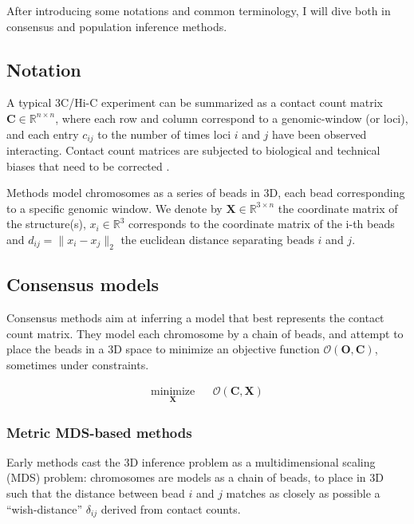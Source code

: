 \documentclass[letterpaper,12pt]{article}
\newcommand{\Xb}{\textbf{X}}
\newcommand{\RR}{\mathbb{R}}
\begin{document}
After introducing some notations and common terminology, I will dive both in
consensus and population inference methods.

\subsection*{Notation}

A typical 3C/Hi-C experiment can be summarized as a contact
count matrix $\mathbf{C} \in \RR^{n \times n}$, where each row and column
correspond to a genomic-window (or loci), and each entry $c_{ij}$ to the
number of times loci $i$ and $j$ have been observed interacting. Contact count
matrices are subjected to biological and technical biases that need to be
corrected \citep{imakaev:iterative, cournac:normalization, yaffe:probabilistic,
hu:hicnorm}.

Methods model chromosomes as a series of beads in 3D, each bead corresponding
to a specific genomic window. We denote by $\textbf{X} \in \RR^{3 \times n}$
the coordinate matrix of the structure(s), $x_i \in \RR^3$ corresponds to
the coordinate matrix of the i-th beads and $d_{ij} = \|x_i - x_j\|_2$ the
euclidean distance separating beads $i$ and $j$.

\subsection*{Consensus models}

Consensus methods aim at inferring a model that best represents the contact
count matrix. They model each chromosome by a chain of beads, and attempt to
place the beads in a 3D space to minimize an objective function
$\mathcal{O}(\mathbf{O}, \mathbf{C})$, sometimes
under constraints.

\begin{equation*}
\renewcommand{\arraystretch}{2}
\begin{array}{ccl}
\underset{\Xb}{\text{minimize}} & & \mathcal{O}(\mathbf{C}, \Xb)
\end{array}
\end{equation*}

\subsubsection*{Metric MDS-based methods}

Early methods \citep{dekker:capturing, duan:three-dimensional,
tanizawa:mapping, ay:three-dimensional} cast the 3D inference problem as a
multidimensional scaling (MDS) problem: chromosomes are models as a chain of
beads, to place in 3D such that the distance between bead $i$ and $j$ matches
as closely as possible a ``wish-distance'' $\delta_{ij}$ derived from contact
counts.
\end{document}
